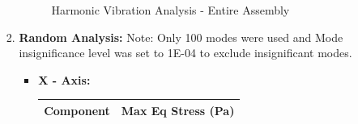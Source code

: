 \documentclass[../../main.tex]{subfiles}
\begin{document}
\begin{enumerate}
\begin{enumerate}
\begin{enumerate}
\begin{figure}[H]
                    \caption{Harmonic Vibration Analysis - Entire Assembly }
                    \label{fig:sys_CAD}
                \end{figure}
                \newpage
                \item \textbf{Random Analysis: }Note: Only 100 modes were used and Mode insignificance level was set to 1E-04 to exclude insignificant modes.
                \begin{itemize}
                    \item \textbf{X - Axis:}
                    \begin{table}[h!]
                        \centering
                        \begin{tabular}{|p{8cm}|p{5cm}|}
                        \hline
                        \textbf{Component} & \textbf{Max Eq Stress (Pa)}\\
                        \hline
                       

\end{tabular}
\end{table}
\end{itemize}
\end{enumerate}
\end{enumerate}
\end{enumerate}
\end{document}
